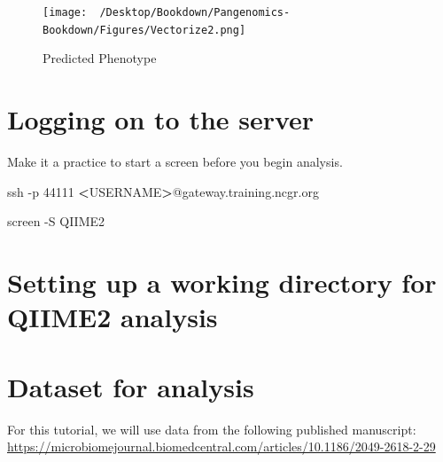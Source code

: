 \documentclass[
]{book}
\newenvironment{Shaded}{\begin{snugshade}}{\end{snugshade}}
\newcommand{\AttributeTok}[1]{\textcolor[rgb]{0.77,0.63,0.00}{#1}}
\newcommand{\BuiltInTok}[1]{#1}
\newcommand{\ExtensionTok}[1]{#1}
\newcommand{\FunctionTok}[1]{\textcolor[rgb]{0.00,0.00,0.00}{#1}}
\newcommand{\NormalTok}[1]{#1}
\newcommand{\OperatorTok}[1]{\textcolor[rgb]{0.81,0.36,0.00}{\textbf{#1}}}
\newcommand{\VariableTok}[1]{\textcolor[rgb]{0.00,0.00,0.00}{#1}}
\begin{document}
\begin{figure}
\centering
\texttt{[image: ~/Desktop/Bookdown/Pangenomics-Bookdown/Figures/Vectorize2.png]}
\caption{Predicted Phenotype}
\end{figure}

\hypertarget{logging-on-to-the-server}{%
\section{Logging on to the server}\label{logging-on-to-the-server}}

Make it a practice to start a screen before you begin analysis.

\begin{Shaded}
\begin{Highlighting}[]
\FunctionTok{ssh} \AttributeTok{{-}p}\NormalTok{ 44111 }\OperatorTok{\textless{}}\NormalTok{USERNAME}\OperatorTok{\textgreater{}}\NormalTok{@gateway.training.ncgr.org}

\ExtensionTok{screen} \AttributeTok{{-}S}\NormalTok{ QIIME2}
\end{Highlighting}
\end{Shaded}

\hypertarget{setting-up-a-working-directory-for-qiime2-analysis}{%
\section{Setting up a working directory for QIIME2 analysis}\label{setting-up-a-working-directory-for-qiime2-analysis}}

\begin{Shaded}
\end{Shaded}

\hypertarget{dataset-for-analysis}{%
\section{Dataset for analysis}\label{dataset-for-analysis}}

For this tutorial, we will use data from the following published manuscript:
\url{https://microbiomejournal.biomedcentral.com/articles/10.1186/2049-2618-2-29}
\end{document}

